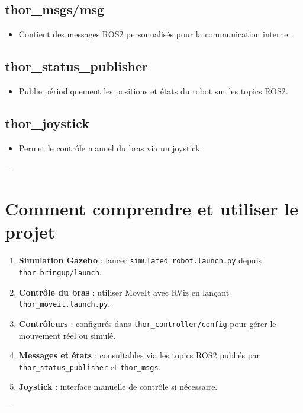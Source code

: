\documentclass[a4paper,12pt]{article}
\numberwithin{equation}{section}
\begin{document}
\subsection{thor\_msgs/msg}
\begin{itemize}
    \item Contient des messages ROS2 personnalisés pour la communication interne.
\end{itemize}

\subsection{thor\_status\_publisher}
\begin{itemize}
    \item Publie périodiquement les positions et états du robot sur les topics ROS2.
\end{itemize}

\subsection{thor\_joystick}
\begin{itemize}
    \item Permet le contrôle manuel du bras via un joystick.
\end{itemize}

---

\section{Comment comprendre et utiliser le projet}

\begin{enumerate}
    \item \textbf{Simulation Gazebo} : lancer \texttt{simulated\_robot.launch.py} depuis \texttt{thor\_bringup/launch}.
    \item \textbf{Contrôle du bras} : utiliser MoveIt avec RViz en lançant \texttt{thor\_moveit.launch.py}.
    \item \textbf{Contrôleurs} : configurés dans \texttt{thor\_controller/config} pour gérer le mouvement réel ou simulé.
    \item \textbf{Messages et états} : consultables via les topics ROS2 publiés par \texttt{thor\_status\_publisher} et \texttt{thor\_msgs}.
    \item \textbf{Joystick} : interface manuelle de contrôle si nécessaire.
\end{enumerate}

---
\end{document}
